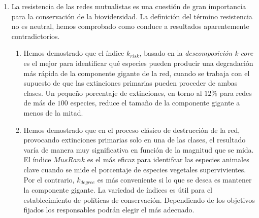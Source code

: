 \begin{enumerate}
\item La resistencia de las redes mutualistas es una cuestión de gran importancia para la conservación de la biovidersidad. La definición del término resistencia no es neutral, hemos comprobado como conduce a resultados aparentemente contradictorios.
	\begin{enumerate}
	\item Hemos demostrado que el índice ${k}_{risk}$, basado en la \textit{descomposición k-core} es el mejor para identificar qué especies pueden producir una degradación más rápida de la componente gigante de la red, cuando se trabaja con el supuesto de que las extinciones primarias pueden proceder de ambas clases. Un pequeño porcentaje de extinciones, en torno al $12\%$ para redes de más de $100$ especies, reduce el tamaño de la componente gigante a menos de la mitad.
	\item Hemos demostrado que en el proceso clásico de destrucción de la red, provocando extinciones primarias solo en una de las clases, el resultado varía de manera muy significativa en función de la magnitud que se mida. El índice $MusRank$ es el más eficaz para identifcar las especies animales clave cuando se mide el porcentaje de especies vegetales supervivientes. Por el contrario, ${k}_{degree}$ es más conveniente si lo que se desea es mantener la componente gigante. La variedad de índices es útil para el establecimiento de políticas de conservación. Dependiendo de los objetivos fijados los responsables podrán elegir el más adecuado.
	\end{enumerate}
	
\end{enumerate}